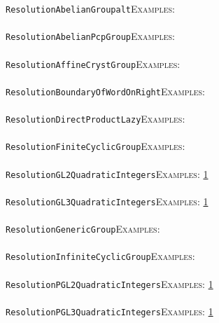 \documentclass[a4paper,11pt]{report}
\begin{document}
{{ \texttt{ResolutionAbelianGroup{\textunderscore}alt}{\nobreakspace}{\nobreakspace}{\nobreakspace}{\nobreakspace}\textsc{Examples:} \\
 \\
 \texttt{ResolutionAbelianPcpGroup}{\nobreakspace}{\nobreakspace}{\nobreakspace}{\nobreakspace}\textsc{Examples:} \\
 \\
 \texttt{ResolutionAffineCrystGroup}{\nobreakspace}{\nobreakspace}{\nobreakspace}{\nobreakspace}\textsc{Examples:} \\
 \\
 \texttt{ResolutionBoundaryOfWordOnRight}{\nobreakspace}{\nobreakspace}{\nobreakspace}{\nobreakspace}\textsc{Examples:} \\
 \\
 \texttt{ResolutionDirectProductLazy}{\nobreakspace}{\nobreakspace}{\nobreakspace}{\nobreakspace}\textsc{Examples:} \\
 \\
 \texttt{ResolutionFiniteCyclicGroup}{\nobreakspace}{\nobreakspace}{\nobreakspace}{\nobreakspace}\textsc{Examples:} \\
 \\
 \texttt{ResolutionGL2QuadraticIntegers}{\nobreakspace}{\nobreakspace}{\nobreakspace}{\nobreakspace}\textsc{Examples:} \href{tutorial/chap10.html} {1}{\nobreakspace} \\
 \\
 \texttt{ResolutionGL3QuadraticIntegers}{\nobreakspace}{\nobreakspace}{\nobreakspace}{\nobreakspace}\textsc{Examples:} \href{tutorial/chap10.html} {1}{\nobreakspace} \\
 \\
 \texttt{ResolutionGenericGroup}{\nobreakspace}{\nobreakspace}{\nobreakspace}{\nobreakspace}\textsc{Examples:} \\
 \\
 \texttt{ResolutionInfiniteCyclicGroup}{\nobreakspace}{\nobreakspace}{\nobreakspace}{\nobreakspace}\textsc{Examples:} \\
 \\
 \texttt{ResolutionPGL2QuadraticIntegers}{\nobreakspace}{\nobreakspace}{\nobreakspace}{\nobreakspace}\textsc{Examples:} \href{tutorial/chap10.html} {1}{\nobreakspace} \\
 \\
 \texttt{ResolutionPGL3QuadraticIntegers}{\nobreakspace}{\nobreakspace}{\nobreakspace}{\nobreakspace}\textsc{Examples:} \href{tutorial/chap10.html} {1}{\nobreakspace} \\
}}
\end{document}
